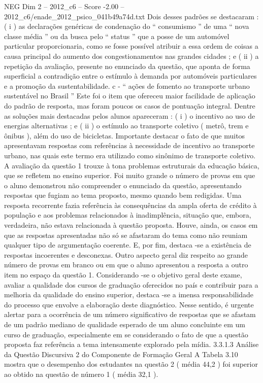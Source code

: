 \begin{textsample}{NEG Dim 2 – 2012\_c6 – Score -2.00 – 2012\_c6/enade\_2012\_psico\_041b49a74d.txt}
Dois desses padrões se destacaram : ( i ) as declarações genéricas de condenação do “ consumismo ” de uma “ nova classe média ” ou da busca pelo “ status ” que a posse de um automóvel particular proporcionaria, como se fosse possível atribuir a essa ordem de coisas a causa principal do aumento dos congestionamentos nas grandes cidades ; e ( ii ) a repetição da avaliação, presente no enunciado da questão, que aponta de forma superficial a contradição entre o estímulo à demanda por automóveis particulares e a promoção da sustentabilidade. c - “ ações de fomento ao transporte urbano sustentável no Brasil ” Este foi o item que ofereceu maior facilidade de aplicação do padrão de resposta, mas foram poucos os casos de pontuação integral.
Dentre as soluções mais destacadas pelos alunos apareceram : ( i ) o incentivo ao uso de energias alternativas ; e ( ii ) o estímulo ao transporte coletivo ( metrô, trem e ônibus ), além do uso de bicicletas.
Importante destacar o fato de que muitos apresentavam respostas com referências à necessidade de incentivo ao transporte urbano, nas quais este termo era utilizado como sinônimo de transporte coletivo.
A avaliação da questão 1 trouxe à tona problemas estruturais da educação básica, que se refletem no ensino superior.
Foi muito grande o número de provas em que o aluno demonstrou não compreender o enunciado da questão, apresentando respostas que fugiam ao tema proposto, mesmo quando bem redigidas.
Uma resposta recorrente fazia referência às consequências da ampla oferta de crédito à população e aos problemas relacionados à inadimplência, situação que, embora, verdadeira, não estava relacionada à questão proposta.
Houve, ainda, os casos em que as respostas apresentadas não só se afastaram do tema como não reuniam qualquer tipo de argumentação coerente.
E, por fim, destaca -se a existência de respostas incoerentes e desconexas.
Outro aspecto geral diz respeito ao grande número de provas em branco ou em que o aluno apresentou a resposta a outro item no espaço da questão 1.
Considerando -se o objetivo geral deste exame, avaliar a qualidade dos cursos de graduação oferecidos no país e contribuir para a melhoria da qualidade do ensino superior, destaca -se a imensa responsabilidade do processo que envolve a elaboração deste diagnóstico.
Nesse sentido, é urgente alertar para a ocorrência de um número significativo de respostas que se afastam de um padrão mediano de qualidade esperado de um aluno concluinte em um curso de graduação, especialmente em se considerando o fato de que a questão proposta faz referência a tema intensamente explorado pela mídia. 3.3.1.3 Análise da Questão Discursiva 2 do Componente de Formação Geral A Tabela 3.10 mostra que o desempenho dos estudantes na questão 2 ( média 44,2 ) foi superior ao obtido na questão de número 1 ( média 32,1 ).

\end{textsample}
